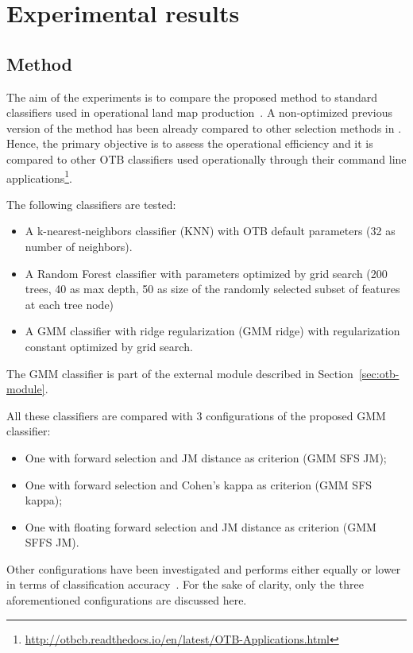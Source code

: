 \documentclass[journal,peerreview,onecolumn]{IEEEtran}
\begin{document}
\section{Experimental results}
\label{sec:test}

    \subsection{Method}
    \label{sec:method}

    The aim  of the experiments is  to compare the proposed  method to
    standard    classifiers    used    in   operational    land    map
    production~\cite{rs70912356}. A non-optimized  previous version of
    the method has been already compared to other selection methods in
    \cite{fauvel2015fast}.  Hence, the primary  objective is to assess
    the  operational  efficiency  and  it is  compared  to  other  OTB
    classifiers   used  operationally   through  their   command  line
    applications\footnote{\url{http://otbcb.readthedocs.io/en/latest/OTB-Applications.html}}.

    The following classifiers are tested:
    \begin{itemize}
        \item A k-nearest-neighbors classifier (KNN) with OTB default parameters (32 as number of neighbors).
        \item A Random Forest classifier with parameters optimized by grid search (200 trees, 40 as max depth, 50 as size of the randomly selected subset of features at each tree node)
        \item A GMM classifier with ridge regularization (GMM ridge) with regularization constant optimized by grid search.
    \end{itemize}
    The GMM classifier is part of the external module described in Section~\ref{sec:otb-module}.

    All these classifiers are compared with 3 configurations of the proposed GMM classifier:
    \begin{itemize}
    \item One with forward selection and JM distance as criterion (GMM SFS JM);
    \item One with forward selection and Cohen's kappa as criterion (GMM SFS kappa);
    \item One with floating forward selection and JM distance as criterion (GMM SFFS JM).
    \end{itemize}
    Other configurations  have been  investigated and  performs either
    equally     or     lower     in    terms     of     classification
    accuracy~\cite{al:report}. For the sake of clarity, only the three
    aforementioned configurations are discussed here.
\end{document}

